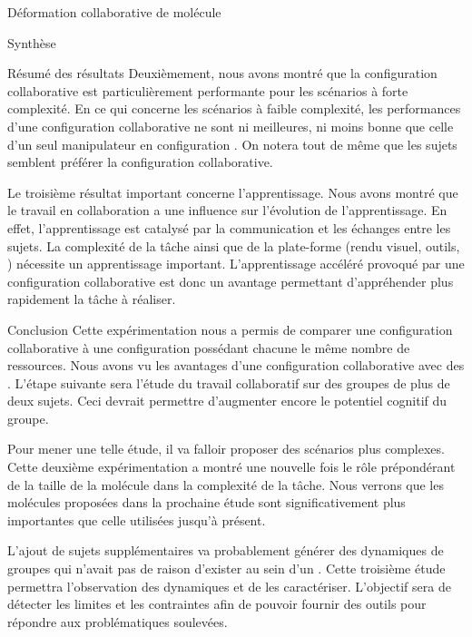 \documentclass[myfrancais,ngerman,english,frenchb]{mythesis}
\begin{document}
\begin{mychapter}{Déformation collaborative de molécule}
\begin{mysection}{Synthèse}
\begin{mysubsection}{Résumé des résultats}
				Deuxièmement, nous avons montré que la configuration collaborative est particulièrement performante pour les scénarios à forte complexité.
				En ce qui concerne les scénarios à faible complexité, les performances d'une configuration collaborative ne sont ni meilleures, ni moins bonne que celle d'un seul manipulateur en configuration .
				On notera tout de même que les sujets semblent préférer la configuration collaborative.

				Le troisième résultat important concerne l'apprentissage.
				Nous avons montré que le travail en collaboration a une influence sur l'évolution de l'apprentissage.
				En effet, l'apprentissage est catalysé par la communication et les échanges entre les sujets.
				La complexité de la tâche ainsi que de la plate-forme (rendu visuel, outils, \myetc) nécessite un apprentissage important.
				L'apprentissage accéléré provoqué par une configuration collaborative est donc un avantage permettant d'appréhender plus rapidement la tâche à réaliser.
			\end{mysubsection}
			\begin{mysubsection}{Conclusion}
				Cette expérimentation nous a permis de comparer une configuration collaborative à une configuration  possédant chacune le même nombre de ressources.
				Nous avons vu les avantages d'une configuration collaborative avec des .
				L'étape suivante sera l'étude du travail collaboratif sur des groupes de plus de deux sujets.
				Ceci devrait permettre d'augmenter encore le potentiel cognitif du groupe.

				Pour mener une telle étude, il va falloir proposer des scénarios plus complexes.
				Cette deuxième expérimentation a montré une nouvelle fois le rôle prépondérant de la taille de la molécule dans la complexité de la tâche.
				Nous verrons que les molécules proposées dans la prochaine étude sont significativement plus importantes que celle utilisées jusqu'à présent.

				L'ajout de sujets supplémentaires va probablement générer des dynamiques de groupes qui n'avait pas de raison d'exister au sein d'un .
				Cette troisième étude permettra l'observation des dynamiques et de les caractériser.
				L'objectif sera de détecter les limites et les contraintes afin de pouvoir fournir des outils pour répondre aux problématiques soulevées.


\end{mysubsection}
\end{mysection}
\end{mychapter}
\end{document}
